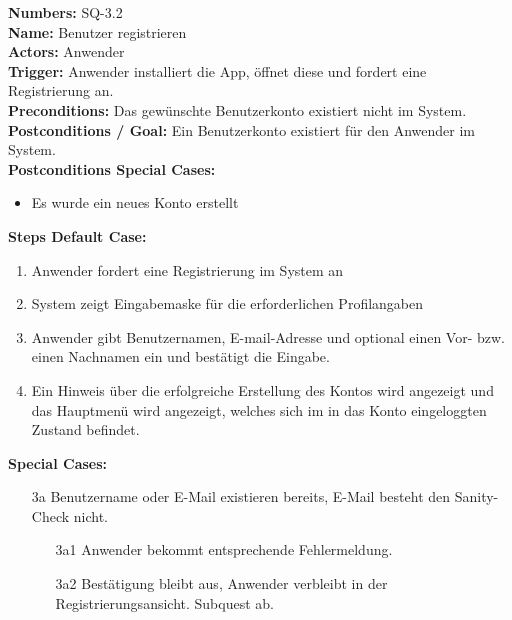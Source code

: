 \documentclass{article}
\begin{document}
\newpage
\begin{samepage}
\textbf{Numbers:} SQ-3.2\\
\textbf{Name:} Benutzer registrieren\\
\textbf{Actors:} Anwender\\
\textbf{Trigger:} Anwender installiert die App, öffnet diese und fordert eine Registrierung an.\\
\textbf{Preconditions:} Das gewünschte Benutzerkonto existiert nicht im System. \\
\textbf{Postconditions / Goal:} Ein Benutzerkonto existiert für den Anwender im System.\\
\textbf{Postconditions Special Cases:} 
\begin{itemize}
    \item Es wurde ein neues Konto erstellt
\end{itemize}
\textbf{Steps Default Case:}
\begin{enumerate}
    \item Anwender fordert eine Registrierung im System an
    \item System zeigt Eingabemaske für die erforderlichen Profilangaben
    \item Anwender gibt Benutzernamen, E-mail-Adresse und optional einen Vor- bzw. einen Nachnamen ein und bestätigt die Eingabe.
    \item Ein Hinweis über die erfolgreiche Erstellung des Kontos wird angezeigt und das Hauptmenü wird angezeigt, welches sich im in das Konto eingeloggten Zustand befindet.
\end{enumerate}
\textbf{Special Cases:}
\begin{itemize}
\item [3a] Benutzername oder E-Mail existieren bereits, E-Mail besteht den Sanity-Check nicht.
\begin{itemize}
    \item [3a1] Anwender bekommt entsprechende Fehlermeldung.
    \item [3a2] Bestätigung bleibt aus, Anwender verbleibt in der Registrierungsansicht.
    Subquest ab.
\end{itemize}
\end{itemize}
\end{samepage}
\end{document}

